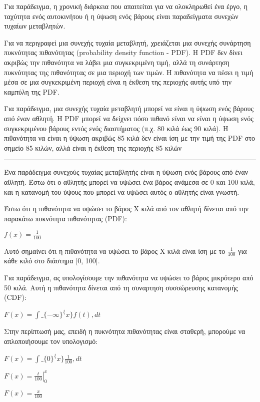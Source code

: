 \documentclass[11pt]{article}
\begin{document}
Για παράδειγμα, η χρονική διάρκεια που απαιτείται για να ολοκληρωθεί ένα
έργο, η ταχύτητα ενός αυτοκινήτου ή η ύψωση ενός βάρους είναι
παραδείγματα συνεχών τυχαίων μεταβλητών.

Για να περιγραφεί μια συνεχής τυχαία μεταβλητή, χρειάζεται μια συνεχής
συνάρτηση πυκνότητας πιθανότητας (probability density function - PDF). Η
PDF δεν δίνει ακριβώς την πιθανότητα να λάβει μια συγκεκριμένη τιμή,
αλλά τη συνάρτηση πυκνότητας της πιθανότητας σε μια περιοχή των τιμών. Η
πιθανότητα να πέσει η τιμή μέσα σε μια συγκεκριμένη περιοχή είναι η
έκθεση της περιοχής αυτής υπό την καμπύλη της PDF.

Για παράδειγμα, μια συνεχής τυχαία μεταβλητή μπορεί να είναι η ύψωση
ενός βάρους από έναν αθλητή. Η PDF μπορεί να δείχνει πόσο πιθανό είναι
να είναι η ύψωση ενός συγκεκριμένου βάρους εντός ενός διαστήματος (π.χ.
80 κιλά έως 90 κιλά). Η πιθανότητα να είναι η ύψωση ακριβώς 85 κιλά δεν
είναι ίση με την τιμή της PDF στο σημείο 85 κιλών, αλλά είναι η έκθεση
της περιοχής 85 κιλών

\begin{center}\rule{0.5\linewidth}{0.5pt}\end{center}

Ένα παράδειγμα συνεχούς τυχαίας μεταβλητής είναι η ύψωση ενός βάρους από
έναν αθλητή. Έστω ότι ο αθλητής μπορεί να υψώσει ένα βάρος ανάμεσα σε 0
και 100 κιλά, και η κατανομή του ύψους που μπορεί να υψώσει αυτός ο
αθλητής είναι γνωστή.

Έστω ότι η πιθανότητα να υψώσει το βάρος Χ κιλά από τον αθλητή δίνεται
από την παρακάτω πυκνότητα πιθανότητας (PDF):

$ f(x) = \frac{1}{100} $

Αυτό σημαίνει ότι η πιθανότητα να υψώσει το βάρος Χ κιλά είναι ίση με το
$ \frac{1}{100} $ για κάθε κιλό στο διάστημα {[}0, 100{]}.

Για παράδειγμα, ας υπολογίσουμε την πιθανότητα να υψώσει το βάρος
μικρότερο από 50 κιλά. Αυτή η πιθανότητα δίνεται από τη συναρτηση
συσσώρευσης κατανομής (CDF):

$ F(x) = \int\_\{-\infty\}^\{x\} f(t) , dt $

Στην περίπτωσή μας, επειδή η πυκνότητα πιθανότητας είναι σταθερή,
μπορούμε να απλοποιήσουμε τον υπολογισμό:

$ F(x) = \int\_\{0\}^\{x\} \frac{1}{100} , dt $

$ F(x) = \left. \frac{t}{100} \right|_{0}^{x} $

$ F(x) = \frac{x}{100} $
\end{document}
